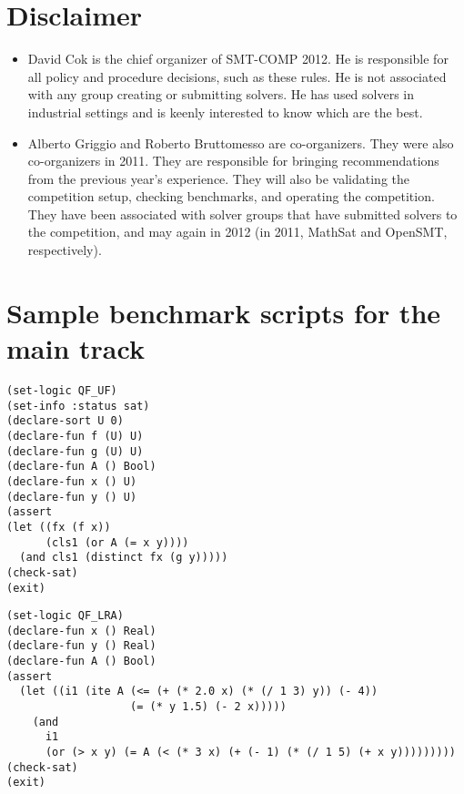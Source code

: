 \documentclass[12pt]{article}
\begin{document}
\section{Disclaimer}
\begin{itemize}
\item David Cok is the chief organizer of SMT-COMP 2012. He is 
responsible for all policy and procedure decisions, such as these
rules. He is not associated 
with any group creating or submitting solvers. He has used solvers
in industrial settings and is keenly interested to know which are the best.

\item Alberto Griggio and Roberto Bruttomesso are co-organizers. They 
were also co-organizers in 2011. They are responsible for bringing 
recommendations from the previous year's experience. They will also 
be validating the competition setup, checking benchmarks, and
operating the competition. They have been associated with solver groups
that have submitted solvers to the competition, and may again in 2012 (in 2011, 
MathSat and OpenSMT, respectively).
\end{itemize}



\appendix
\section{Sample benchmark scripts for the main track}


{\footnotesize
\begin{verbatim}
(set-logic QF_UF)
(set-info :status sat)
(declare-sort U 0)
(declare-fun f (U) U)
(declare-fun g (U) U)
(declare-fun A () Bool)
(declare-fun x () U)
(declare-fun y () U)
(assert
(let ((fx (f x))
      (cls1 (or A (= x y))))
  (and cls1 (distinct fx (g y)))))
(check-sat)
(exit)
\end{verbatim}}



{\footnotesize
\begin{verbatim}
(set-logic QF_LRA)
(declare-fun x () Real)
(declare-fun y () Real)
(declare-fun A () Bool)
(assert
  (let ((i1 (ite A (<= (+ (* 2.0 x) (* (/ 1 3) y)) (- 4))
                   (= (* y 1.5) (- 2 x)))))
    (and
      i1
      (or (> x y) (= A (< (* 3 x) (+ (- 1) (* (/ 1 5) (+ x y)))))))))
(check-sat)
(exit)
\end{verbatim}}


\end{document}
